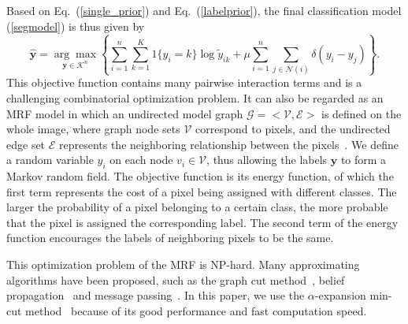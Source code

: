 \documentclass[journal]{IEEEtran}
\begin{document}
	Based on Eq.\ (\ref{single_prior}) and Eq.\ (\ref{labelprior}), the final {{classification}} model (\ref{segmodel}) is thus given by 
	\begin{equation}\label{final_seg}
	\widehat{\mathbf{y}}\!=\!\underset{\mathbf{y}\in\mathcal{K}^{n}}{\arg\max}\!\left\{\sum_{i=1}^{n}\!\sum_{k=1}^{K}\!1\{y_{i}=k\}\!
	\!\log{\widetilde{{y}}_{ik}}\!+\!\mu\!\sum_{i=1}^{n}\!\!\sum_{j\in\mathcal{N}(i)}\!\!\delta(y_{i}\!-\!y_{j})\right\}.
	\end{equation}
	This objective function contains many pairwise interaction terms and is a challenging combinatorial optimization problem. It can also be regarded as an MRF model in which an undirected model graph $\mathcal{G}=<\mathcal{V},\mathcal{E}>$ is defined on the whole image, where graph node sets $\mathcal{V}$ correspond to pixels, and the undirected edge set $\mathcal{E}$ represents the neighboring relationship between the pixels~\cite{boykov2001interactive}. We define a random variable $y_i$ on each node $v_{i}\in \mathcal{V}$, thus allowing the labels $\mathbf{y}$ to form a Markov random field. The objective function is its energy function, of which the first term represents the cost of a pixel being assigned with different classes. The larger the probability of a pixel belonging to a certain class, the more probable that the pixel is assigned the corresponding label. The second term of the energy function encourages the labels of neighboring pixels to be the same. 
	
	This optimization problem of the MRF is NP-hard. Many approximating algorithms have been proposed, such as the graph cut method~\cite{boykov2001fast,kolmogorov2004energy}, belief propagation~\cite{yedidia2005constructing} and message passing~\cite{kolmogorov2006convergent}. In this paper, we use the $\alpha$-expansion min-cut method~\cite{boykov2001fast} because of its good performance and fast computation speed. 
	
\end{document}
